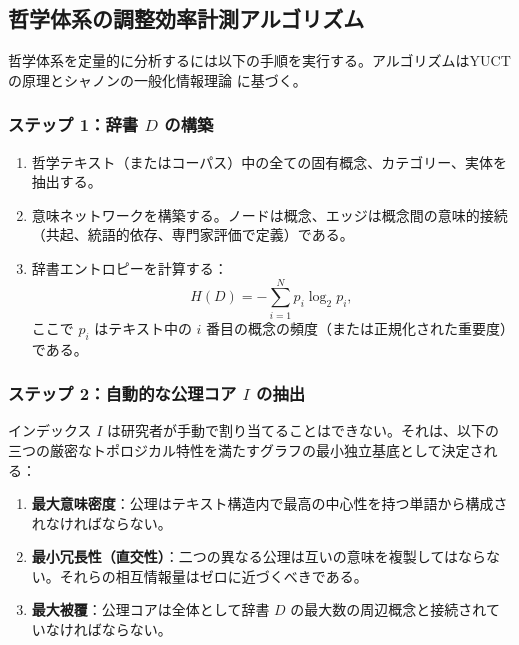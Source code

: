 \documentclass[11pt,a4paper]{article}
\begin{document}
	\subsection{哲学体系の調整効率計測アルゴリズム}
	\label{subsec:measurement-algorithm}
	
	哲学体系を定量的に分析するには以下の手順を実行する。アルゴリズムはYUCTの原理とシャノンの一般化情報理論 \cite{AppendixX} に基づく。
	
	\subsubsection{ステップ 1：辞書 \(D\) の構築}
	
	\begin{enumerate}
		\item 哲学テキスト（またはコーパス）中の全ての固有概念、カテゴリー、実体を抽出する。
		\item 意味ネットワークを構築する。ノードは概念、エッジは概念間の意味的接続（共起、統語的依存、専門家評価で定義）である。
		\item 辞書エントロピーを計算する：
		\[
		H(D) = -\sum_{i=1}^{N} p_i \log_2 p_i,
		\]
		ここで \(p_i\) はテキスト中の \(i\) 番目の概念の頻度（または正規化された重要度）である。
	\end{enumerate}
	
	\subsubsection{ステップ 2：自動的な公理コア \(I\) の抽出}
	\label{sec:auto-basis}
	
	インデックス \(I\) は研究者が手動で割り当てることはできない。それは、以下の三つの厳密なトポロジカル特性を満たすグラフの最小独立基底として決定される：
	\begin{enumerate}
		\item \textbf{最大意味密度}：公理はテキスト構造内で最高の中心性を持つ単語から構成されなければならない。
		\item \textbf{最小冗長性（直交性）}：二つの異なる公理は互いの意味を複製してはならない。それらの相互情報量はゼロに近づくべきである。
		\item \textbf{最大被覆}：公理コアは全体として辞書 \(D\) の最大数の周辺概念と接続されていなければならない。
	\end{enumerate}
	
\end{document}

